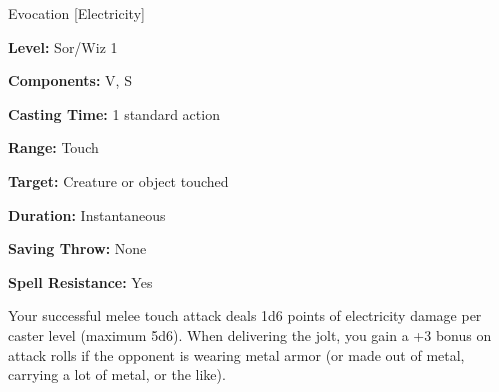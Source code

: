 
Evocation [Electricity]

\textbf{Level:} Sor/Wiz 1

\textbf{Components:} V, S

\textbf{Casting Time:} 1 standard action

\textbf{Range:} Touch

\textbf{Target:} Creature or object touched

\textbf{Duration:} Instantaneous

\textbf{Saving Throw:} None

\textbf{Spell Resistance:} Yes

Your successful melee touch attack deals 1d6 points of electricity damage per caster 
level (maximum 5d6). When delivering the jolt, you gain a +3 bonus on attack rolls 
if the opponent is wearing metal armor (or made out of metal, carrying a lot of 
metal, or the like).

